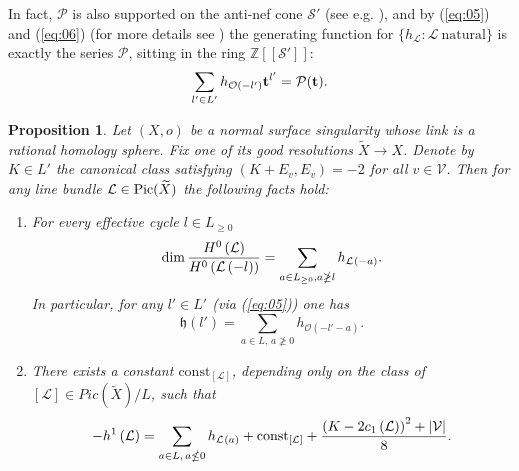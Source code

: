 \documentclass[10pt,a4paper]{amsart}
\numberwithin{equation}{section}
\numberwithin{equation}{subsection}
\theoremstyle{plain}
\newtheorem{proposition}[equation]{Proposition}
\theoremstyle{definition}
\begin{document}
In fact, ${\mathcal{P}}$ is also  supported on the anti-nef cone ${\mathcal{S}}'$ (see
e.g. \cite[(4.2)]{CDGb}), and by (\ref{eq:05}) and (\ref{eq:06})
(for more details see \cite[(4.2.12)]{CDGb}) the generating function
for  $\{h_{\mathcal{L}}:{\mathcal{L}} \ \mbox{natural}\}$ is exactly
the series ${\mathcal{P}}$, sitting in the ring ${\mathbb{Z}}[[{\mathcal{S}}']]$:
\begin{equation}\label{eq:10}
      \sum_{l'\in L'} h_{{\mathcal{O}}(-l')} {{\bf t}}^{l'} ={\mathcal{P}}({{\bf t}}).
\end{equation}

\begin{proposition}\label{th:1} Let $(X,o)$ be a normal surface singularity whose link is a
rational homology sphere. Fix one of its good resolutions
$\widetilde{X}\to X$. Denote by $K\in L'$ the {\em canonical
class} satisfying $(K+E_v,E_v)=-2$ for all $v\in{\mathcal{V}}$. Then for any
line bundle ${\mathcal{L}}\in{\rm Pic}(\widetilde{X})$ the following
facts hold:

\begin{enumerate}
\item\label{th:1.1}
For every effective cycle \(l \in  L_{\geq 0}\)
\begin{equation}\label{eq:07}
    \dim {\mathchoice
         \frac{{H^0 \left( {\mathcal{L}} \right)}}{{H^0 \left( {\mathcal{L}} \left( - l \right) \right)}}   
  {\mathinner{{{H^0 \left( {\mathcal{L}} \right)}}/{{H^0 \left( {\mathcal{L}} \left( - l \right) \right)}}}}
  {\mathinner{{{H^0 \left( {\mathcal{L}} \right)}}/{{H^0 \left( {\mathcal{L}} \left( - l \right) \right)}}}}
  {\mathinner{{{H^0 \left( {\mathcal{L}} \right)}}/{{H^0 \left( {\mathcal{L}} \left( - l \right) \right)}}}}
} =
    \sum_{ a\in L_{\geq 0},  a \ngeq l}
    h_{{\mathinner{{\mathcal{L}}\sb{}}    {\left({-a}\right)}}}.
\end{equation}
In particular, for any $l'\in L'$  (via (\ref{eq:05})) one has
\begin{equation}\label{eq:10b}
{\mathfrak{h}}(l')=\sum_{a\in L,\, a\not\geq 0} h_{{\mathcal{O}}(-l'-a)}.
\end{equation}
\item\label{th:1.2}
There exists a constant $\mathrm{const}_{[{\mathcal{L}}]}$, depending only on the
class of $[{\mathcal{L}}]\in Pic(\widetilde{X})/L$,  such that
\begin{equation}\label{eq:08}
   - h^1 \left( {\mathcal{L}} \right) = \sum_{a \in L,\, a \nleq 0}
    h_{{\mathinner{{\mathcal{L}}\sb{}}    {\left({a}\right)}}} +
    \mathrm{const}_{[{\mathcal{L}}]} +
    {\mathchoice
         \frac{{{\left(K - 2 c_1  \left( {\mathcal{L}} \right)\right)}^2 + |{\mathcal{V}}|}}{{8}}   
  {\mathinner{{{{\left(K - 2 c_1  \left( {\mathcal{L}} \right)\right)}^2 + |{\mathcal{V}}|}}/{{8}}}}
  {\mathinner{{{{\left(K - 2 c_1  \left( {\mathcal{L}} \right)\right)}^2 + |{\mathcal{V}}|}}/{{8}}}}
  {\mathinner{{{{\left(K - 2 c_1  \left( {\mathcal{L}} \right)\right)}^2 + |{\mathcal{V}}|}}/{{8}}}}
}.
  \end{equation}
\end{enumerate}
\end{proposition}
\end{document}
